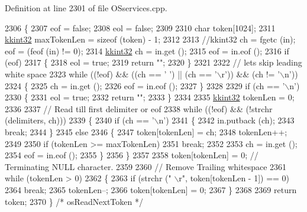 Definition at line 2301 of file O\+Sservices.\+cpp.


\begin{DoxyCode}
2306 \{
2307   eof = \textcolor{keyword}{false};
2308   eol = \textcolor{keyword}{false};
2309 
2310   \textcolor{keywordtype}{char}  token[1024];
2311   \hyperlink{namespace_k_k_b_a8fa4952cc84fda1de4bec1fbdd8d5b1b}{kkint32}  maxTokenLen = \textcolor{keyword}{sizeof} (token) - 1;
2312 
2313   \textcolor{comment}{//kkint32  ch = fgetc (in);  eof = (feof (in) != 0);}
2314   \hyperlink{namespace_k_k_b_a8fa4952cc84fda1de4bec1fbdd8d5b1b}{kkint32}  ch = in.get ();  
2315   eof = in.eof ();
2316   \textcolor{keywordflow}{if}  (eof)
2317   \{
2318     eol = \textcolor{keyword}{true};
2319     \textcolor{keywordflow}{return} \textcolor{stringliteral}{""};
2320   \}
2321 
2322   \textcolor{comment}{// lets skip leading white space}
2323   \textcolor{keywordflow}{while}  ((!eof)  &&  ((ch == \textcolor{charliteral}{' '}) || (ch == \textcolor{charliteral}{'\(\backslash\)r'}))  &&  (ch != \textcolor{charliteral}{'\(\backslash\)n'}))
2324   \{
2325     ch = in.get (); 
2326     eof = in.eof ();
2327   \}
2328 
2329   \textcolor{keywordflow}{if}  (ch == \textcolor{charliteral}{'\(\backslash\)n'})
2330   \{
2331     eol = \textcolor{keyword}{true};
2332     \textcolor{keywordflow}{return} \textcolor{stringliteral}{""};
2333   \}
2334 
2335   \hyperlink{namespace_k_k_b_a8fa4952cc84fda1de4bec1fbdd8d5b1b}{kkint32} tokenLen = 0;
2336 
2337   \textcolor{comment}{// Read till first delimiter or eof}
2338   \textcolor{keywordflow}{while}  ((!eof)  &&  (!strchr (delimiters, ch)))
2339   \{
2340     \textcolor{keywordflow}{if}  (ch == \textcolor{charliteral}{'\(\backslash\)n'})
2341     \{
2342       in.putback (ch);
2343       \textcolor{keywordflow}{break};
2344     \}
2345     \textcolor{keywordflow}{else}
2346     \{
2347       token[tokenLen] = ch;
2348       tokenLen++;
2349       
2350       \textcolor{keywordflow}{if}  (tokenLen >= maxTokenLen)
2351         \textcolor{keywordflow}{break};
2352 
2353       ch = in.get (); 
2354       eof = in.eof ();
2355     \}
2356   \}
2357 
2358   token[tokenLen] = 0;  \textcolor{comment}{// Terminating NULL character.}
2359 
2360   \textcolor{comment}{// Remove Trailing whitespace}
2361   \textcolor{keywordflow}{while}  (tokenLen > 0)
2362   \{
2363     \textcolor{keywordflow}{if}  (strchr (\textcolor{stringliteral}{" \(\backslash\)r"}, token[tokenLen - 1]) == 0)
2364       \textcolor{keywordflow}{break};
2365     tokenLen--;
2366     token[tokenLen] = 0;
2367   \}
2368 
2369   \textcolor{keywordflow}{return}  token;
2370 \}  \textcolor{comment}{/* osReadNextToken */}
\end{DoxyCode}
